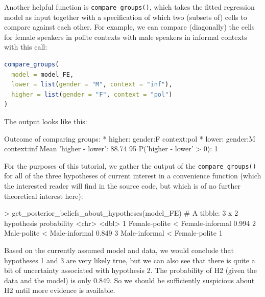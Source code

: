 \documentclass[nobib]{tufte-handout}
\begin{document}
Another helpful function is \texttt{compare\_groups()}, which takes the fitted regression model as input together with a specification of which two (subsets of) cells to compare
against each other. For example, we can compare (diagonally) the cells for female speakers in
polite contexts with male speakers in informal contexts with this call:

\begin{minipage}[]{1.3\textwidth}
\begin{lstlisting}[language=R]
compare_groups(
  model = model_FE, 
  lower = list(gender = "M", context = "inf"),
  higher = list(gender = "F", context = "pol")
)
\end{lstlisting}
\end{minipage}

\vspace{-0.5cm}

\noindent The output looks like this:

\begin{minipage}[]{\textwidth}
\begin{rc}
Outcome of comparing groups:
 * higher:  gender:F context:pol 
 * lower:   gender:M context:inf 
Mean 'higher - lower':  88.74 
95%
P('higher - lower' > 0):  1 
\end{rc}
\end{minipage}

\vspace{-0.5cm}

For the purposes of this tutorial, we gather the output of the \texttt{compare\_groups()} for
all of the three hypotheses of current interest in a convenience function (which the interested
reader will find in the source code, but which is of no further theoretical interest here): 

\begin{minipage}[]{\textwidth}
\begin{rc}
> get_posterior_beliefs_about_hypotheses(model_FE)
# A tibble: 3 x 2
  hypothesis                      probability
  <chr>                                 <dbl>
1 Female-polite < Female-informal       0.994
2 Male-polite < Male-informal           0.849
3 Male-informal < Female-polite         1
\end{rc}
\end{minipage}

\vspace{-0.5cm}

Based on the currently assumed model and data, we would conclude that hypotheses 1 and 3 are very likely true, but we can also see that there is quite a bit of uncertainty associated with hypothesis 2. The probability of H2 (given the data and the model) is only 0.849. So we should be sufficiently suspicious about H2 until more evidence is available.
\end{document}
